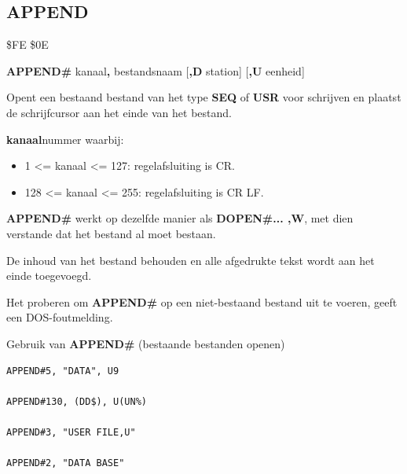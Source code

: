 
\newpage
\subsection{APPEND}
\begin{description}[leftmargin=2cm,style=nextline]
\item [Token:]    \$FE \$0E

\item [Formaat:]   {\bf APPEND\#} kanaal{\bf,} bestandsnaam [{\bf,D} station] [{\bf,U} eenheid]

\item [Gebruik:]    Opent een bestaand bestand van het type {\bf SEQ} of {\bf USR} voor schrijven en plaatst de schrijfcursor aan het einde van het bestand.

                  {\bf kanaal}nummer waarbij:
                  \begin{itemize}
                     \item 1 <= kanaal <= 127: regelafsluiting is CR.                     \item 128 <= kanaal <= 255: regelafsluiting is CR LF.
                  \end{itemize}

                  \filenamedefinition

                  \drivedefinition

                  \unitdefinition

\item [Opmerkingen:]  {\bf APPEND\#} werkt op dezelfde manier als {\bf DOPEN\#... ,W}, met dien verstande dat het bestand al moet bestaan.

                  De inhoud van het bestand behouden en alle afgedrukte tekst wordt aan het einde toegevoegd.

                  Het proberen om {\bf APPEND\#} op een niet-bestaand bestand uit te voeren, geeft een DOS-foutmelding.

\item [Voorbeelden:] Gebruik van {\bf APPEND\#} (bestaande bestanden openen)

\begin{tcolorbox}[colback=black,coltext=white]
\verbatimfont{\codefont}
\begin{verbatim}
APPEND#5, "DATA", U9

APPEND#130, (DD$), U(UN%)

APPEND#3, "USER FILE,U"

APPEND#2, "DATA BASE"
\end{verbatim}
\end{tcolorbox}
\end{description}

